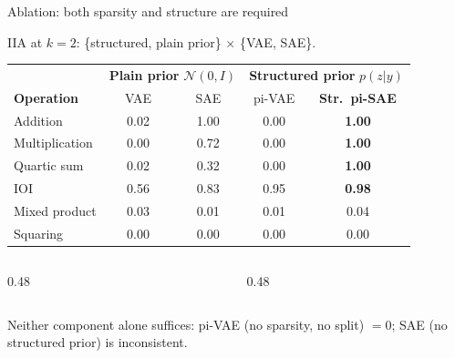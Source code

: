 \documentclass[aspectratio=169,11pt]{beamer}
\begin{document}
\begin{frame}{Ablation: both sparsity and structure are required}
\vspace{-0.3em}
\centering

{\small IIA at $k{=}2$: \{structured, plain prior\} $\times$ \{VAE, SAE\}.}

\vspace{0.3em}
{\scriptsize\setlength{\tabcolsep}{3.5pt}
\begin{tabular}{@{}l|cc|cc@{}}
\toprule
& \multicolumn{2}{c|}{\textbf{Plain prior} $\mathcal{N}(0,I)$} & \multicolumn{2}{c}{\textbf{Structured prior} $p(z|y)$} \\
\textbf{Operation} & VAE & SAE & pi-VAE & \textbf{Str.\ pi-SAE} \\
\midrule
Addition & 0.02 & \textcolor{always}{1.00} & 0.00 & \textbf{\textcolor{always}{1.00}} \\
Multiplication & 0.00 & 0.72 & 0.00 & \textbf{\textcolor{always}{1.00}} \\
Quartic sum & 0.02 & 0.32 & 0.00 & \textbf{\textcolor{always}{1.00}} \\
IOI & 0.56 & 0.83 & \textcolor{always}{0.95} & \textbf{\textcolor{always}{0.98}} \\
\midrule
Mixed product & 0.03 & 0.01 & 0.01 & 0.04 \\
Squaring & 0.00 & 0.00 & 0.00 & 0.00 \\
\bottomrule
\end{tabular}}

\vspace{0.8em}
\begin{columns}[T]
\begin{column}{0.48\textwidth}
\end{column}
\begin{column}{0.48\textwidth}
\end{column}
\end{columns}

\vspace{0.3em}
\centering
{\scriptsize Neither component alone suffices: pi-VAE (no sparsity, no split) $= 0$; SAE (no structured prior) is inconsistent.}
\end{frame}
\end{document}
